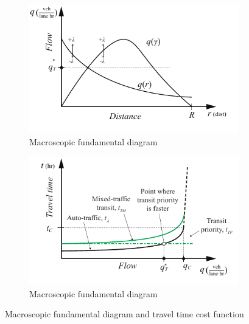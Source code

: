 \documentclass{article}
\begin{document}
\begin{figure}[!ht]
     \centering
     \hfill
     \begin{subfigure}[b]{0.45\textwidth}
         \centering
         \includegraphics[width=\textwidth]{diagram_flow_combo}
         \caption{Macroscopic fundamental diagram}
         \label{fig:mfd}
     \end{subfigure}
     \hfill
     \begin{subfigure}[b]{0.45\textwidth}
         \centering
         \includegraphics[width=\textwidth]{diagram_transit_traveltime}
        \caption{Macroscopic fundamental diagram}
         \label{fig:traveltime}
     \end{subfigure}
     \hfill
     \caption{Macroscopic fundamental diagram and travel time cost function}
\end{figure}
\end{document}
